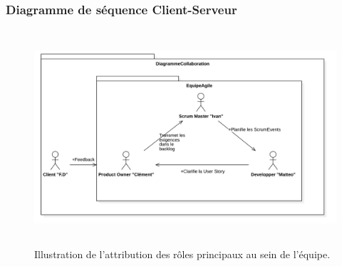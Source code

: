 \subsubsection{Diagramme de séquence Client-Serveur}
\begin{figure}[H]
	\centering
	\includegraphics[height=8cm]{img/diagCollaboration.png} 
	\caption{Illustration de l'attribution des rôles principaux au sein de l'équipe.}
\end{figure}
